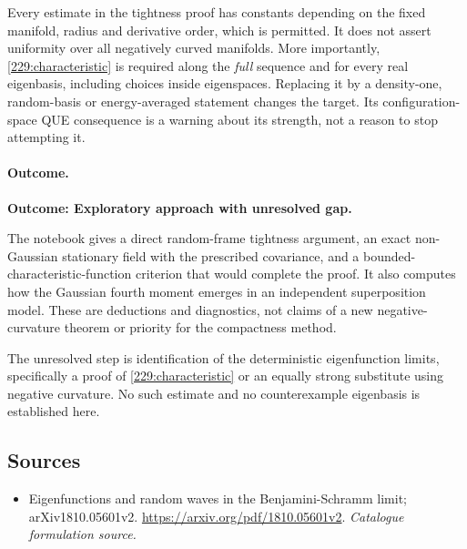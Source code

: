 \documentclass[11pt,a4paper]{article}
\numberwithin{equation}{section}
\begin{document}
Every estimate in the tightness proof has constants depending on the fixed
manifold, radius and derivative order, which is permitted. It does not
assert uniformity over all negatively curved manifolds. More importantly,
\eqref{229:characteristic} is required along the \emph{full} sequence and
for every real eigenbasis, including choices inside eigenspaces. Replacing
it by a density-one, random-basis or energy-averaged statement changes the
target. Its configuration-space QUE consequence is a warning about its
strength, not a reason to stop attempting it.

\paragraph{Outcome.}
\textbf{Outcome: Exploratory approach with unresolved gap.}

The notebook gives a direct random-frame tightness argument, an exact
non-Gaussian stationary field with the prescribed covariance, and a
bounded-characteristic-function criterion that would complete the proof.
It also computes how the Gaussian fourth moment emerges in an independent
superposition model. These are deductions and diagnostics, not claims of
a new negative-curvature theorem or priority for the compactness method.

The unresolved step is identification of the deterministic eigenfunction
limits, specifically a proof of \eqref{229:characteristic} or an equally
strong substitute using negative curvature. No such estimate and no
counterexample eigenbasis is established here.
\subsection{Sources}
\begin{itemize}\raggedright
\item[\textnormal{[S1]}]\hypertarget{source:229:1}{} Eigenfunctions and random waves in the Benjamini-Schramm limit; arXiv1810.05601v2.
\url{https://arxiv.org/pdf/1810.05601v2}.
{\small\textit{Catalogue formulation source.}}
\end{itemize}
\end{document}
